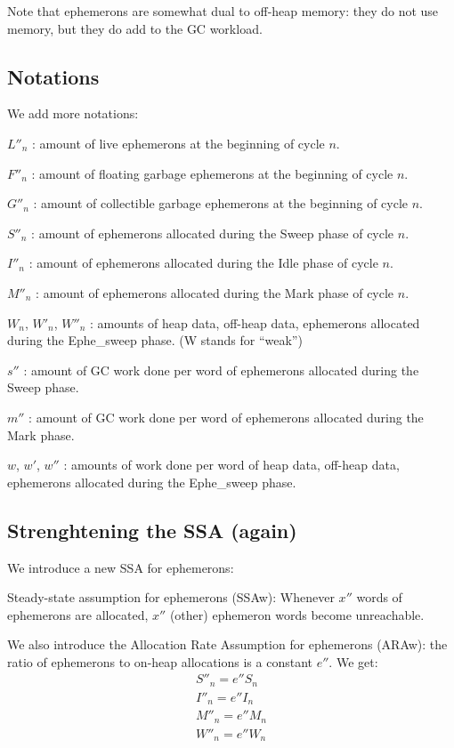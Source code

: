 \documentclass{article}
\begin{document}
Note that ephemerons are somewhat dual to off-heap memory: they do not
use memory, but they do add to the GC workload.

\subsection{Notations}

We add more notations:

\bigskip
$L''_n$ : amount of live ephemerons at the beginning of cycle $n$.

$F''_n$ : amount of floating garbage ephemerons at the beginning
of cycle $n$.

$G''_n$ : amount of collectible garbage ephemerons at the
beginning of cycle $n$.

$S''_n$ : amount of ephemerons allocated during the Sweep phase
of cycle $n$.

$I''_n$ : amount of ephemerons allocated during the Idle phase
of cycle $n$.

$M''_n$ : amount of ephemerons allocated during the Mark phase
of cycle $n$.

$W_n$, $W'_n$, $W''_n$ : amounts of heap data, off-heap
data, ephemerons allocated during the Ephe\_sweep phase. (W stands for
``weak'')

$s''$ : amount of GC work done per word of ephemerons allocated
during the Sweep phase.

$m''$ : amount of GC work done per word of ephemerons allocated
during the Mark phase.

$w$, $w'$, $w''$ : amounts of work done per word of
heap data, off-heap data, ephemerons allocated during the Ephe\_sweep
phase.


\subsection{Strenghtening the SSA (again)}

We introduce a new SSA for ephemerons:

Steady-state assumption for ephemerons (SSAw): Whenever $x''$
words of ephemerons are allocated, $x''$ (other) ephemeron words
become unreachable.

We also introduce the Allocation Rate Assumption for ephemerons
(ARAw): the ratio of ephemerons to on-heap allocations is a constant
$e''$. We get:
\begin{gather}
S''_n = e''S_n \label{eqn-S''} \\
I''_n = e''I_n \label{eqn-I''} \\
M''_n = e''M_n \label{eqn-M''} \\
W''_n = e''W_n \label{eqn-W''}
\end{gather}
\end{document}
